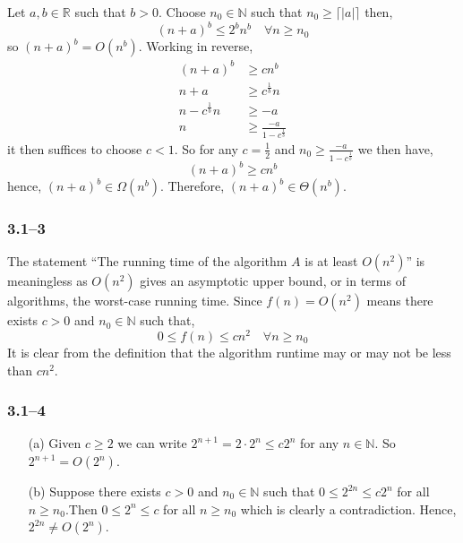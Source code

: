 Let $a,b\in\mathbb{R}$ such that $b>0$. Choose $n_{0}\in\mathbb{N}$ such that $n_{0}\geq\lceil|a|\rceil$ then,
\begin{equation*}
	(n+a)^{b}\leq 2^{b}n^{b} \quad \forall n\geq n_{0}
\end{equation*}
so $(n+a)^{b}=O(n^{b})$. Working in reverse,
\begin{equation*}
	\begin{aligned}
		(n+a)^{b} &\geq cn^{b}\\
		n+a &\geq c^{\frac{1}{b}}n\\
		n-c^{\frac{1}{b}}n &\geq -a\\
		n &\geq \frac{-a}{1-c^{\frac{1}{b}}}
	\end{aligned}
\end{equation*}
it then suffices to choose $c<1$. So for any $c=\frac{1}{2}$ and $n_{0}\geq \frac{-a}{1-c^{\frac{1}{b}}}$ we then have,
\begin{equation*}
	(n+a)^{b}\geq cn^{b}
\end{equation*}
hence, $(n+a)^{b}\in\Omega(n^{b})$. Therefore, $(n+a)^{b}\in\Theta(n^{b})$.

\subsubsection*{3.1--3}

The statement ``The running time of the algorithm $A$ is at least $O(n^{2})$'' is meaningless as $O(n^{2})$ gives an asymptotic upper bound, or in terms of algorithms, the worst-case running time. Since $f(n)=O(n^{2})$ means there exists $c>0$ and $n_{0}\in\mathbb{N}$ such that,
\begin{equation*}
	0\leq f(n)\leq cn^{2}\quad\forall n\geq n_{0}
\end{equation*}
It is clear from the definition that the algorithm runtime may or may not be less than $cn^{2}$.

\subsubsection*{3.1--4}

\begin{itemize}
	\item [(a)]
		Given $c\geq 2$ we can write $2^{n+1}=2\cdot2^{n}\leq c2^{n}$ for any $n\in\mathbb{N}$. So $2^{n+1}=O(2^{n})$.
	\item [(b)]
		Suppose there exists $c>0$ and $n_{0}\in\mathbb{N}$ such that $0\leq 2^{2n}\leq c2^{n}$ for all $n\geq n_{0}$.Then $0\leq 2^{n} \leq c$ for all $n\geq n_{0}$ which is clearly a contradiction. Hence, $2^{2n}\neq O(2^{n})$.
\end{itemize}

